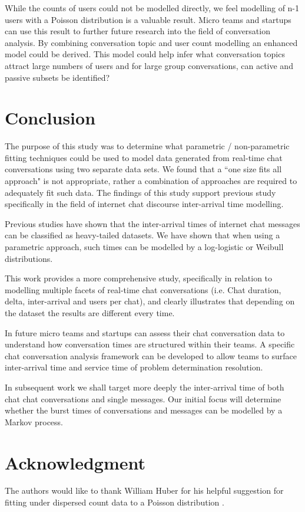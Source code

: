 \documentclass[conference]{IEEEtran}
\begin{document}
While the counts of users could not be modelled directly, we feel modelling of n-1 users with a Poisson distribution is a valuable result. Micro teams and startups can use this result to further future research into the field of conversation analysis. By combining conversation topic and user count modelling an enhanced model could be derived. This model could help infer what conversation topics attract large numbers of users and for large group conversations, can active and passive subsets be identified?

\section{Conclusion}

The purpose of this study was to determine what parametric / non-parametric fitting techniques could be used to model data generated from real-time chat conversations using two separate data sets. We found that a ``one size fits all approach" is not appropriate, rather a combination of approaches are required to adequately fit such data. The findings of this study support previous study specifically in the field of internet chat discourse inter-arrival time modelling.

Previous studies have shown that the inter-arrival times of internet chat messages can be classified as heavy-tailed datasets. We have shown that when using a parametric approach, such times can be modelled by a log-logistic or Weibull distributions. 

This work provides a more comprehensive study, specifically in relation to modelling multiple facets of real-time chat conversations (i.e. Chat duration, delta, inter-arrival and users per chat), and clearly illustrates that depending on the dataset the results are different every time.

In future micro teams and startups can assess their chat conversation data to understand how conversation times are structured within their teams. A specific chat conversation analysis framework can be developed to allow teams to surface inter-arrival time and service time of problem determination resolution. 

In subsequent work we shall target more deeply the inter-arrival time of both chat chat conversations and single messages. Our initial focus will determine whether the burst times of conversations and messages can be modelled by a Markov process.


\section*{Acknowledgment}
The authors would like to thank William Huber for his helpful suggestion for fitting under dispersed count data to a Poisson distribution \cite{poissoncount}.



\end{document}
